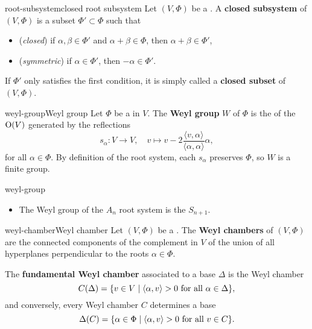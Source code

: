 \begin{topic}{root-subsystem}{closed root subsystem}
    Let $(V, \Phi)$ be a . A \textbf{closed subsystem} of $(V, \Phi)$ is a subset $\Phi' \subset \Phi$ such that
    \begin{itemize}
        \item (\textit{closed}) if $\alpha, \beta \in \Phi'$ and $\alpha + \beta \in \Phi$, then $\alpha + \beta \in \Phi'$,
        \item (\textit{symmetric}) if $\alpha \in \Phi'$, then $-\alpha \in \Phi'$.
    \end{itemize}
    If $\Phi'$ only satisfies the first condition, it is simply called a \textbf{closed subset} of $(V, \Phi)$.
\end{topic}

\begin{topic}{weyl-group}{Weyl group}
    Let $\Phi$ be a  in $V$. The \textbf{Weyl group} $W$ of $\Phi$ is the  of the  $\textup{O}(V)$ generated by the reflections
    \[ s_\alpha : V \to V, \quad v \mapsto v - 2 \frac{\langle v, \alpha \rangle}{\langle \alpha, \alpha \rangle} \alpha , \]
    for all $\alpha \in \Phi$. By definition of the root system, each $s_\alpha$ preserves $\Phi$, so $W$ is a finite group.
\end{topic}

\begin{example}{weyl-group}
    \begin{itemize}
        \item The Weyl group of the $A_n$ root system is the  $S_{n + 1}$.
    \end{itemize}
\end{example}

\begin{topic}{weyl-chamber}{Weyl chamber}
    Let $(V, \Phi)$ be a . The \textbf{Weyl chambers} of $(V, \Phi)$ are the connected components of the complement in $V$ of the union of all hyperplanes perpendicular to the roots $\alpha \in \Phi$.

    The \textbf{fundamental Weyl chamber} associated to a base $\Delta$ is the Weyl chamber
    \[ C(\Delta) = \{ v \in V \mid \langle \alpha, v \rangle > 0 \textup{ for all } \alpha \in \Delta \} , \]
    and conversely, every Weyl chamber $C$ determines a base
    \[ \Delta(C) = \{ \alpha \in \Phi \mid \langle \alpha, v \rangle > 0 \textup{ for all } v \in C \} . \]
\end{topic}

